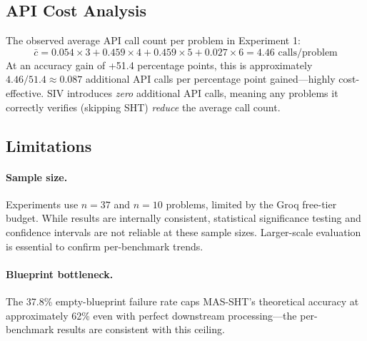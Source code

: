 \documentclass[11pt,a4paper]{article}
\begin{document}
\subsection{API Cost Analysis}
The observed average API call count per problem in Experiment 1:
\begin{equation*}
\bar{c} = 0.054 \times 3 + 0.459 \times 4 + 0.459 \times 5 + 0.027 \times 6 = 4.46 \text{ calls/problem}
\end{equation*}
At an accuracy gain of +51.4 percentage points, this is approximately $4.46 / 51.4 \approx 0.087$ additional API calls per percentage point gained---highly cost-effective.
SIV introduces \emph{zero} additional API calls, meaning any problems it correctly verifies (skipping SHT) \emph{reduce} the average call count.
\subsection{Limitations}
\paragraph{Sample size.}
Experiments use $n=37$ and $n=10$ problems, limited by the Groq free-tier budget.
While results are internally consistent, statistical significance testing and confidence intervals are not reliable at these sample sizes.
Larger-scale evaluation is essential to confirm per-benchmark trends.
\paragraph{Blueprint bottleneck.}
The 37.8\% empty-blueprint failure rate caps MAS-SHT's theoretical accuracy at approximately 62\% even with perfect downstream processing---the per-benchmark results are consistent with this ceiling.
\end{document}
